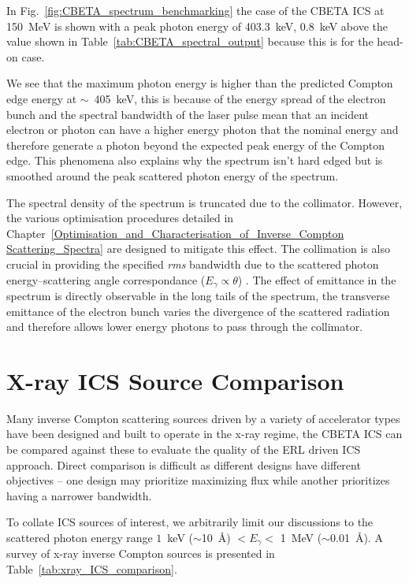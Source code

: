 \documentclass[../main.tex]{subfiles}
\begin{document}
In Fig.~\ref{fig:CBETA_spectrum_benchmarking} the case of the CBETA ICS at 150~\si{\mega\electronvolt} is shown with a peak photon energy of 403.3~\si{\kilo\electronvolt}, 0.8~\si{\kilo\electronvolt} above the value shown in Table~\ref{tab:CBETA_spectral_output} because this is for the head-on case. 

We see that the maximum photon energy is higher than the predicted Compton edge energy at $\sim$~405~\si{\kilo\electronvolt}, this is because of the energy spread of the electron bunch and the spectral bandwidth of the laser pulse mean that an incident electron or photon can have a higher energy photon that the nominal energy and therefore generate a photon beyond the expected peak energy of the Compton edge. This phenomena also explains why the spectrum isn't hard edged but is smoothed around the peak scattered photon energy of the spectrum. 

The spectral density of the spectrum is truncated due to the collimator. However, the various optimisation procedures detailed in Chapter~\ref{Optimisation_and_Characterisation_of_Inverse_Compton Scattering_Spectra} are designed to mitigate this effect. The collimation is also crucial in providing the specified \textit{rms} bandwidth due to the scattered photon energy--scattering angle correspondance ($E_{\gamma}\propto\theta$) . The effect of emittance in the spectrum is directly observable in the long tails of the spectrum, the transverse emittance of the electron bunch varies the divergence of the scattered radiation and therefore allows lower energy photons to pass through the collimator. 



\section{X-ray ICS Source Comparison}
\label{sec:xray_ICS_comparison}

Many inverse Compton scattering sources driven by a variety of accelerator types have been designed and built to operate in the x-ray regime, the CBETA ICS can be compared against these to evaluate the quality of the ERL driven ICS approach. Direct comparison is difficult as different designs have different objectives -- one design may prioritize maximizing flux while another prioritizes having a narrower bandwidth.

To collate ICS sources of interest, we arbitrarily limit our discussions to the scattered photon energy range $1$~\si{\kilo\electronvolt} ($\sim$10~\si{\angstrom}) $< E_{\gamma} <$ 1~\si{\mega\electronvolt} ($\sim$0.01~\si{\angstrom}). A survey of x-ray inverse Compton sources is presented in Table~\ref{tab:xray_ICS_comparison}.
\end{document}

